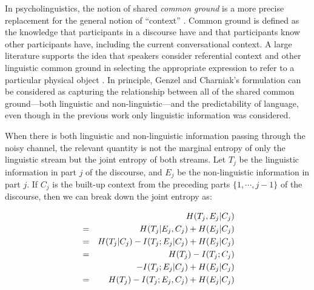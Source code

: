 \documentclass[11pt,letterpaper]{article}
\begin{document}
In psycholinguistics, the notion of shared \emph{common ground} is a more precise replacement for the general notion of ``context'' \cite{clark1996}. Common ground is defined as the knowledge that participants in a discourse have and that participants know other participants have, including the current conversational context. A large literature supports the idea that speakers consider referential context and other linguistic common ground in selecting the appropriate expression to refer to a particular physical object \cite{brennan1996,metzing2003,dale1995,sedivy1999}. In principle, Genzel and Charniak's formulation can be considered as capturing the relationship between all of the shared common ground---both linguistic and non-linguistic---and the predictability of language, even though in the previous work only linguistic information was considered. 

When there is both linguistic and non-linguistic information passing through the noisy channel, the relevant quantity is not the marginal entropy of only the linguistic stream but the joint entropy of both streams.  Let $T_j$ be the linguistic information in part $j$ of the discourse, and $E_j$ be the non-linguistic information in part $j$.  If $C_j$ is the built-up context from the preceding parts $\{1,\cdots,j-1\}$ of the discourse, then we can break down the joint entropy as:\vspace*{-1.5em}



\begin{eqnarray}
\nonumber &&\hspace*{-2.5em}H(T_j,E_j|C_j) \\
\nonumber &=& H(T_j|E_j,C_j) + H(E_j|C_j) \\
\nonumber                    &=& H(T_j|C_j) - I(T_j;E_j|C_j) + H(E_j|C_j) \\
\nonumber                    &=& H(T_j) - I(T_j;C_j) \\
\nonumber                    && \quad - I(T_j;E_j|C_j) + H(E_j|C_j) \\
\label{eq:joint-entropy}     &=& H(T_j) - I(T_j;E_j,C_j) + H(E_j|C_j)
\end{eqnarray}
\end{document}
